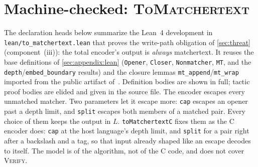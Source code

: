 \section{Machine-checked: \textsc{ToMatchertext}}
\label{sec:appendix:tomatchertext}

The declaration heads below summarize the Lean~4 development in
\texttt{lean/to\_matchertext.lean} that proves the write-path obligation of
\cref{sec:threat} (component~(iii)): the total encoder's output is \emph{always}
matchertext. It reuses the base definitions of \cref{sec:appendix:lean}
(\texttt{Opener}, \texttt{Closer}, \texttt{Nonmatcher}, \texttt{MT}, and the
\texttt{depth}/\texttt{embed\_boundary} results) and the closure lemmas
\texttt{mt\_append}/\texttt{mt\_wrap} imported from the public artifact
of~\cite{matchertext}.
Definition bodies are shown in full; tactic proof bodies are elided and given in
the source file.
The encoder escapes every unmatched matcher. Two parameters let it escape more:
\texttt{cap} escapes an opener past a depth limit, and \texttt{split} escapes
both members of a matched pair. Every choice of them keeps the output in $L$.
\texttt{toMatchertextC} fixes them as the C encoder does: \texttt{cap} at the
host language's depth limit, and \texttt{split} for a pair right after a
backslash and a tag, so that input already shaped like an escape decodes to
itself. The model is of the algorithm,
not of the C code, and does not cover \textsc{Verify}.

